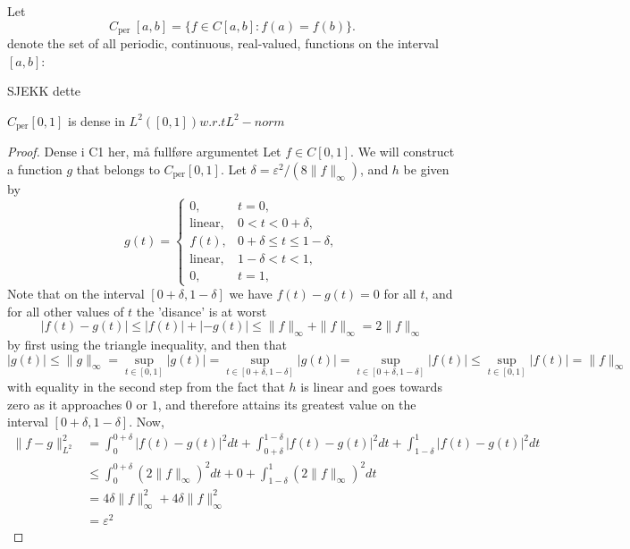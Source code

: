 \documentclass[../thesis.tex]{subfiles}
\begin{document}
Let
\begin{equation*}
C_{\text {per }}[a,b]=\{f \in C[a,b]: f(a)=f(b)\}.
\end{equation*}
denote the set of all periodic, continuous, real-valued, functions on the interval $[a,b]$:

SJEKK dette 
\begin{lemma}
    $C_{\text {per}}[0,1]$ is dense in $L^2([0,1]) w.r.t L^2-norm$
\end{lemma}

\begin{proof}
    Dense i C1 her, må fullføre argumentet
    Let $f \in C[0,1]$. We will construct a function $g$ that belongs to $C_{\text{per}}[0,1]$. Let  $\delta = \varepsilon^2/(8\|f\|_\infty)$, and $h$  be given by
\begin{equation*}
    g(t) = 
    \begin{cases} 0, &  t=0,\\  
        \text{linear}, &  0<t<0+\delta,\\ 
        f(t), & 0+\delta \leq t \leq 1-\delta,\\ 
        \text{linear}, &  1-\delta <t<1,\\ 
        0, &  t=1,
    \end{cases}
\end{equation*}
Note that on the interval $[0+\delta, 1-\delta]$ we have $f(t)-g(t)= 0$ for all $t$, and for all other values of $t$ the 'disance' is at worst 
\begin{equation*}
    \left|f(t)-g(t) \right| \leq |f(t)| + |-g(t)| \leq \|f \|_{\infty} + \|f \|_{\infty} = 2 \|f \|_{\infty}
\end{equation*}
by first using the triangle inequality, and then that
\begin{equation*}
    |g(t)| \leq \|g\|_{\infty} = \sup_{t\in[0,1]} |g(t)| = \sup_{t\in[0+\delta, 1-\delta]} |g(t)| = \sup_{t\in[0+\delta, 1-\delta]} |f(t)| \leq \sup_{t\in[0, 1]} |f(t)| =\| f\|_{\infty}
\end{equation*}
with equality in the second step from the fact that $h$ is linear and goes towards zero as it approaches $0$ or $1$, and therefore attains its greatest value on the interval $[0+\delta,1-\delta]$. Now,
\begin{align*}
    \| f-g \|_{L^2}^2 &=  \int_0^{0+\delta} \left|f(t)-g(t) \right|^2dt + \int_{0+\delta}^{1-\delta} \left|f(t)-g(t) \right|^2dt +\int_{1-\delta}^{1} \left|f(t)-g(t) \right|^2dt\\ 
    &\leq \int_0^{0+\delta} (2 \| f\|_\infty)^2dt + 0 +\int_{1-\delta}^{1} (2 \| f\|_\infty)^2dt\\
    &=  4 \delta \| f\|_\infty^2 + 4 \delta \| f\|_\infty^2\\ 
    &= \varepsilon^2
\end{align*}


\end{proof}
\end{document}
